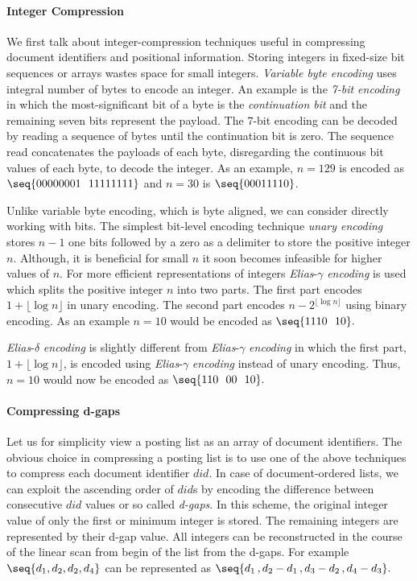 \paragraph{Integer Compression} We first talk about integer-compression techniques useful in compressing document identifiers and positional information. Storing integers in fixed-size bit sequences or arrays wastes space for small integers. 
\emph{Variable byte encoding} uses integral number of bytes to encode an integer. An example is the \emph{7-bit encoding} in which the most-significant bit of a byte is the \emph{continuation bit} and the remaining seven bits represent the payload. The 7-bit encoding can be decoded by reading a sequence of bytes until the continuation bit is zero. The sequence read concatenates the payloads of each byte, disregarding the continuous bit values of each byte, to decode the integer. As an example, $n = 129$ is encoded as $\seq{00000001 \,\,\,\, 11111111}$ and $n = 30$ is $\seq{00011110}$. 


Unlike variable byte encoding, which is byte aligned, we can consider directly working with bits. The simplest bit-level encoding technique \emph{unary encoding} stores $n-1$ one bits followed by a zero as a delimiter to store the positive integer $n$. Although, it is beneficial for small $n$ it soon becomes infeasible for higher values of $n$. For more efficient representations of integers \emph{Elias}-$\gamma$ \emph{encoding} is used which splits the positive integer $n$ into two parts. The first part encodes $1 + \lfloor \log{n} \rfloor$ in unary encoding. The second part encodes $n - 2^{\lfloor \log{n} \rfloor}$ using binary encoding. As an example $n=10$ would be encoded as $\seq{1110 \,\,\,\, 10}.$

\emph{Elias}-$\delta$ \emph{encoding} is slightly different from \emph{Elias}-$\gamma$ \emph{encoding} in which the first part, $1 + \lfloor \log{n} \rfloor$, is encoded using \emph{Elias}-$\gamma$ \emph{encoding} instead of unary encoding. Thus, $n=10$ would now be encoded as $\seq{110 \,\,\,\, 00 \,\,\,\, 10}.$

\paragraph{Compressing d-gaps} Let us for simplicity view a posting list as an array of document identifiers. The obvious choice in compressing a posting list is to use one of the above techniques to compress each document identifier $did$. In case of document-ordered lists, we can exploit the ascending order of $did$s by encoding the difference between consecutive $did$ values or so called \emph{d-gaps}. In this scheme, the original integer value of only the first or minimum integer is stored. The remaining integers are represented by their d-gap value. All integers can be reconstructed in the course of the linear scan from begin of the list from the d-gaps. For example $\seq{d_1,d_2,d_2,d_4}$ can be represented as $\seq{d_1\,,d_2-d_1\,,d_3 - d_2\,,d_4-d_3}.$


